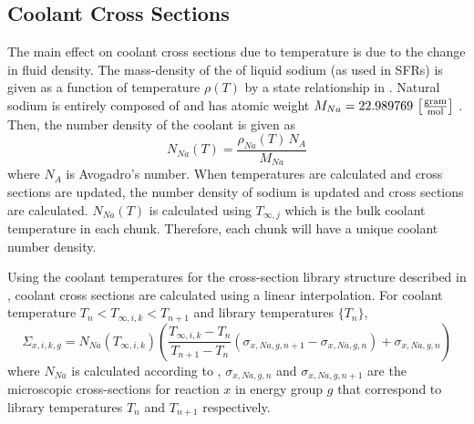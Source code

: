   \subsection{Coolant Cross Sections}
    The main effect on coolant cross sections due to temperature is due to the
    change in fluid density. The mass-density of the of liquid sodium (as used 
    in SFRs) is given as a function of temperature $\rho(T)$ by a state 
    relationship in \cite{sodiumProp}. Natural sodium is entirely composed of 
     and has atomic weight ${M_{Na} = 22.989769
    \,\left[\text{{$\frac{\text{gram}}{\text{mol}}$}}\right]}$ \cite{nuclides}.
    Then, the number density of the coolant is given as
    \begin{equation}
      \label{eq:number_density_sodium}
      N_{Na}(T) = \frac{\rho_{Na}(T) \, N_A}{M_{Na}}
    \end{equation}
    where $N_A$ is Avogadro's number. When temperatures are calculated and
    cross sections are updated, the number density of sodium is updated and
    cross sections are calculated. $N_{Na}(T)$ is calculated using
    $T_{\infty,j}$ which is the bulk coolant temperature in each chunk.
    Therefore, each chunk will have a unique coolant number density.
    

    Using the coolant temperatures for the cross-section library structure
    described in , coolant cross sections are
    calculated using a linear interpolation. For coolant temperature
    $T_{n}<T_{\infty,i,k}<T_{n+1}$ and library temperatures $\{T_n\}$,
    \begin{equation}
      \label{eq:xs_cool}
      \Sigma_{x,i,k,g} = N_{Na}(T_{\infty,i,k}) 
        \left( \frac{T_{\infty,i,k} - T_{n}}{T_{n+1}-T_{n}} 
        (\sigma_{x,Na,g,n+1} - \sigma_{x,Na,g,n})  + \sigma_{x,Na,g,n}\right)
    \end{equation}
    where $N_{Na}$ is calculated according to ,
    $\sigma_{x,Na,g,n}$ and $\sigma_{x,Na,g,n+1}$ are the microscopic 
    cross-sections for reaction $x$ in energy group $g$ that correspond to 
    library temperatures $T_n$ and $T_{n+1}$ respectively.

